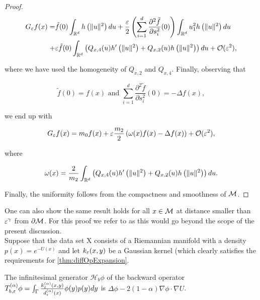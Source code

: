 \begin{proof}
\begin{equation*}\begin{aligned}
G_\varepsilon f(x)=&\tilde{f}(0)\int_{\mathbb{R}^d}h\left(\|u\|^2 \right)du + \frac{\varepsilon}{2}\left(\sum\limits_{i=1}^d \frac{\partial^2 \tilde{f}}{\partial s_i^2}(0) \right)\int_{\mathbb{R}^d}u_1^2 h\left(\|u\|^2\right)du \\
+&\varepsilon\tilde{f}(0)\int_{\mathbb{R}^d}\left(Q_{x,4}(u)h'\left(\|u\|^2\right) + Q_{x,2}(u)h\left(\|u\|^2\right)\right)du + \mathcal{O}(\varepsilon^2),
\end{aligned}\end{equation*}

where we have used the homogeneity of $Q_{x,2}$ and $Q_{x,4}$. Finally, observing that

\begin{equation*}
\tilde{f}(0) = f(x) \text{ and } \sum_{i=1}^d \frac{\partial^2 \tilde{f}}{\partial s_i^2}(0) = -\Delta f(x),
\end{equation*}

we end up with

\begin{equation*}
G_\varepsilon f(x)=m_0 f(x)+\varepsilon\frac{m_2}{2}\left(\omega(x)f(x)-\Delta f(x) \right)+\mathcal{O}(\varepsilon^2),
\end{equation*}

where

\begin{equation*}
\omega(x)=\frac{2}{m_2}\int_{\mathbb{R}^d}\left(Q_{x,4}(u)h'\left(\|u\|^2 \right) + Q_{x,2}(u)h\left(\|u\|^2 \right) \right)du.
\end{equation*}

Finally, the uniformity follows from the compactness and smoothness of $\mathcal{M}$.
\end{proof}

One can also show the same result holds for all $x\in\mathcal{M}$ at distance smaller than $\varepsilon^\gamma$ from $\partial\mathcal{M}$. For this proof we refer to \cite{Coifman20065} as this would go beyond the scope of the present discussion.\\

Suppose that the data set X consists of a Riemannian manifold with a density $p(x) = e^{-U(x)}$ and let $k_\varepsilon(x, y)$ be a Gaussian kernel (which clearly satisfies the requirements for \ref{thm:diffOpExpansion}.

\begin{theorem}\label{thm:bFPO}
The infinitesimal generator $\mathcal{H}_b\phi$ of the backward operator $T_{b,\varepsilon}^{(\alpha)}\phi = \int_\Gamma \frac{k_\varepsilon^{(\alpha)}(x,y)}{d_\varepsilon^{(\alpha)}(x)} \phi(y)p(y)dy $ is $\Delta\phi - 2(1-\alpha)\nabla\phi\cdot\nabla U$.
\end{theorem}

